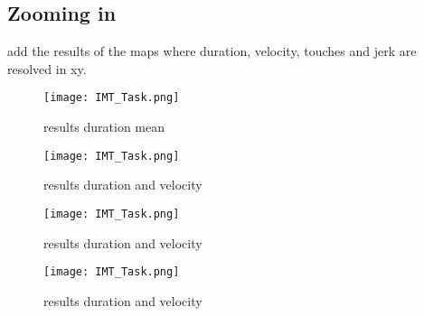 \subsection{Zooming in} add the results of the maps where duration, velocity, touches and jerk are resolved in xy.

\begin{figure}[h]
\centering
\texttt{[image: IMT\_Task.png]}
\vspace{0pt}
\caption{results duration mean}
\label{results_dur_mean}
\end{figure}

\begin{figure}[h]
\centering
\texttt{[image: IMT\_Task.png]}
\vspace{0pt}
\caption{results duration and velocity}
\label{results_dur_effect}
\end{figure}

\begin{figure}[h]
\centering
\texttt{[image: IMT\_Task.png]}
\vspace{0pt}
\caption{results duration and velocity}
\label{results_touches_mean}
\end{figure}

\begin{figure}[h]
\centering
\texttt{[image: IMT\_Task.png]}
\vspace{0pt}
\caption{results duration and velocity}
\label{results_touches_effect}
\end{figure}

\begin{comment}

interpretation histogram binning:
how many samples fall within 1 bin -> samples/srate = duration in seconds per bin, also must consider step size when calculating

what does imagesc return after that? interpretation should stay the same and be sensible -> returns just the gaussian smoothing over the peak that is the histogram count

interpreting regression:
with an increase in presence x more seconds where spent at point xy
for easy interpretation we introduce the reasoning: participants with a higher reported presence spent 1.8 seconds longer at point (4,5 located in the outer corner of the first turn)

interpreting regression:
with an increase in presence participants moved slower closer to the wall and faster in when in the center of the maze path.

for easy interpretation we introduce the reasoning: for each 1 point increase in reported presence, participants walked x km per hour faster when at the center of the maze path and x kmh slower when getting closer to the walls.

\end{comment}